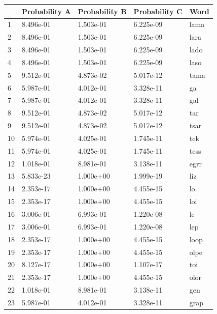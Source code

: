 \begin{table}%
  \centering
  \begin{tabular}{lllll}
    \toprule
       & Probability A & Probability B & Probability C & Word \\
    \midrule
    1  & 8.496e-01     & 1.503e-01     & 6.225e-09     & lama \\
    2  & 8.496e-01     & 1.503e-01     & 6.225e-09     & lara \\
    3  & 8.496e-01     & 1.503e-01     & 6.225e-09     & lado \\
    4  & 8.496e-01     & 1.503e-01     & 6.225e-09     & laso \\
    5  & 9.512e-01     & 4.873e-02     & 5.017e-12     & tama \\
    6  & 5.987e-01     & 4.012e-01     & 3.328e-11     & ga   \\
    7  & 5.987e-01     & 4.012e-01     & 3.328e-11     & gal  \\
    8  & 9.512e-01     & 4.873e-02     & 5.017e-12     & tar  \\
    9  & 9.512e-01     & 4.873e-02     & 5.017e-12     & tsar \\
    10 & 5.974e-01     & 4.025e-01     & 1.745e-11     & tek  \\
    11 & 5.974e-01     & 4.025e-01     & 1.745e-11     & tess \\
    12 & 1.018e-01     & 8.981e-01     & 3.138e-11     & egrr \\
    13 & 5.833e-23     & 1.000e+00     & 1.999e-19     & liz  \\
    14 & 2.353e-17     & 1.000e+00     & 4.455e-15     & lo   \\
    15 & 2.353e-17     & 1.000e+00     & 4.455e-15     & loi  \\
    16 & 3.006e-01     & 6.993e-01     & 1.220e-08     & le   \\
    17 & 3.006e-01     & 6.993e-01     & 1.220e-08     & lep  \\
    18 & 2.353e-17     & 1.000e+00     & 4.455e-15     & loop \\
    19 & 2.353e-17     & 1.000e+00     & 4.455e-15     & olpe \\
    20 & 8.127e-17     & 1.000e+00     & 1.107e-17     & toi  \\
    21 & 2.353e-17     & 1.000e+00     & 4.455e-15     & olor \\
    22 & 1.018e-01     & 8.981e-01     & 3.138e-11     & gen  \\
    23 & 5.987e-01     & 4.012e-01     & 3.328e-11     & grap \\

\end{tabular}
\end{table}
